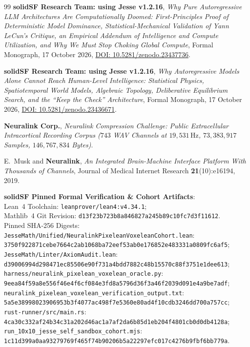 \documentclass[11pt,letterpaper]{article}
\theoremstyle{definition}
\begin{document}
\begin{thebibliography}{99}
\textbf{solidSF Research Team: using Jesse v1.2.16}, \emph{Why Pure Autoregressive LLM Architectures Are Computationally Doomed: First-Principles Proof of Deterministic Model Dominance, Statistical-Mechanical Validation of Yann LeCun's Critique, an Empirical Addendum of Intelligence and Compute Utilization, and Why We Must Stop Choking Global Compute}, Formal Monograph, 17 October 2026, \href{https://doi.org/10.5281/zenodo.23437736}{DOI: 10.5281/zenodo.23437736}.

\textbf{solidSF Research Team: using Jesse v1.2.16}, \emph{Why Autoregressive Models Alone Cannot Reach Human-Level Intelligence: Statistical Physics, Spatiotemporal World Models, Algebraic Topology, Deliberative Equilibrium Search, and the ``Keep the Check'' Architecture}, Formal Monograph, 17 October 2026, \href{https://doi.org/10.5281/zenodo.23436671}{DOI: 10.5281/zenodo.23436671}.

\textbf{Neuralink Corp.}, \emph{Neuralink Compression Challenge: Public Extracellular Intracortical Recording Corpus ($743$ WAV Channels at $19{,}531\,\text{Hz}$, $73{,}383{,}917$ Samples, $146{,}767{,}834$ Bytes)}.

E.~Musk and \textbf{Neuralink}, \emph{An Integrated Brain-Machine Interface Platform With Thousands of Channels}, Journal of Medical Internet Research \textbf{21}(10):e16194, 2019.

\textbf{solidSF Pinned Formal Verification \& Cohort Artifacts}:\\
Lean~4 Toolchain: \nolinkurl{leanprover/lean4:v4.34.1};\\
Mathlib~4 Git Revision: \nolinkurl{d13f23b723b8a846827a245b89c10fc7d3f11612}.\\
Pinned SHA-256 Digests:\\
\nolinkurl{JesseMath/Unified/NeuralinkPixeleanVoxeleanCohort.lean}:\\
\nolinkurl{3750f922871cebe7664c2ab1068ba72eef53ab0e176852e483331a0809fc6af5};\\
\nolinkurl{JesseMath/Linter/AxiomAudit.lean}:\\
\nolinkurl{d39006994d298471ec85506e90f731a4bdd7882c48b15570c88f3751e1dee613};\\
\nolinkurl{harness/neuralink_pixelean_voxelean_oracle.py}:\\
\nolinkurl{9eea84f59a8e556f46e4f6cf084e3fd8a5796d36f3a46f2039d091e4a9be7adf};\\
\nolinkurl{neuralink_pixelean_voxelean_verification_output.txt}:\\
\nolinkurl{5a5e38998023906953b3f4077ac498f7e5360e80ad4f10cdb3246dd700a757cc};\\
\nolinkurl{rust-runner/src/main.rs}:\\
\nolinkurl{4ca30c332af24b34c31a202d46ac1a7af2da6b85d1eb204f4801cb0d0db4128a};\\
\nolinkurl{run_10x10_jesse_self_sandbox_cohort.mjs}:\\
\nolinkurl{1c11d399a0aa93279769f465f74b90206b5a22297efc017c4276b9fbf6bb779a}.

\end{thebibliography}
\end{document}
